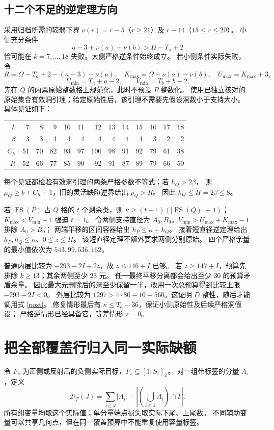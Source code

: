 \documentclass[11pt,a4paper]{article}
\newcommand{\FS}{\operatorname{FS}}
\newcommand{\Z}{\mathbb Z}
\newcommand{\Def}{\mathcal D}
\theoremstyle{definition}
\begin{document}
\subsection{十二个不足的逆定理方向}
采用归档所需的较弱下界
$\nu(r)=r-5$（$r\ge21$）及 $r-14$（$15\le r\le20$）。
小侧充分条件
\[
 a-3+\nu(a)+\nu(b)>\Omega-T_a+2
\]
恰可能在 $k=7,\ldots,18$ 失败。大侧严格逆条件始终成立。
若小侧条件实际失败，令
\[
 R=\Omega-T_a+2-(a-3)-\nu(a),\quad
 K_{\max}=\Omega-\nu(a)-\nu(b),\quad U_{\max}=K_{\max}+3,
\]
\[
 U_{\min}=T_a+a-2,\qquad V_{\min}=T_b+b-2.
\]
先在 $Q$ 的内禀原始整数格上规范化，此时不预设 $P$ 整数化。
使用已独立核对的原始集合有效洞引理；给定原始性后，该引理不需要先假设洞数小于支持大小。
具体见证如下：
\begin{center}\small\begin{tabular}{rrrrrrrrrrrrr}\toprule
$k$&7&8&9&10&11&12&13&14&15&16&17&18\\
$\beta$&3&3&4&4&4&4&4&4&4&3&2&2\\
$C_h$&51&70&82&93&97&100&98&91&92&79&61&38\\
$R$&52&66&77&85&90&92&91&87&89&79&66&50\\\bottomrule
\end{tabular}\end{center}
每个见证都检验有效洞引理的两条严格参数不等式；若 $h_Q>2\beta$，
则 $\mu_Q\ge b+C_h+1$，旧的灵活缺陷逆界给出 $\rho_Q>R$。
因此 $h_Q\le H=2\beta\le8$。

若 $\FS(P)$ 占 $Q$ 格的 $t$ 个剩余类，则
$\kappa\ge(t-1)(|\FS(Q)|-1)$；$K_{\max}<V_{\min}-1$ 强迫 $t=1$。
令两侧支持直径为 $A_0,B_0$。$V_{\min}>U_{\max}+K_{\max}-1$ 排除 $A_0>B_0$；
两端平移的区间容器给出 $h_P\le\kappa+h_Q$。
接着短直径逆定理给出 $h_P,h_Q\le\kappa$、$0\le z\le H$。
该短直径定理不额外要求两侧分别原始。
四个严格余量的最小值依次为 $543,99,536,162$。

普通内层比较为 $-293-2I+2z$，故 $z\le146+I$ 已够。
若 $z\ge147+I$，预算先排除 $k\ge13$；其余两侧至少 23 元。
任一最终平移分离都会给出至少 30 的预算矛盾余量。
因此最大元删除后的洞至少保留一半，改用一次总预算得到比较上限 $-293-2I<0$。
外层比较为 $1297>4\cdot80-10+560$。这证明 $D$ 整性，随后才能调用式 \eqref{post}。
修复情形最后有 $\kappa\le T_a-36$，保证小侧原始性及后续严格洞假设；
严格逆情形已经具备它，等差情形 $z=0$。

\section{把全部覆盖行归入同一实际缺额}\label{rows}
令 $F_s$ 为正侧或反射后的负侧实际目标，$F_s\subseteq[1,S_s]_{\Z}$。
对一组带标签的分量 $A_i$，定义
\[
 \Def_F(J)=\sum_{i\in J}|A_i|-\left|\left(\bigcup_{i\in J}A_i\right)\cap F\right|.
\]
所有组变量均取这个实际值；单分量端点损失取实际下尾、上尾数。
不同辅助变量可以共享几何点，但在同一覆盖预算中不能重复使用容量标签。
\end{document}
